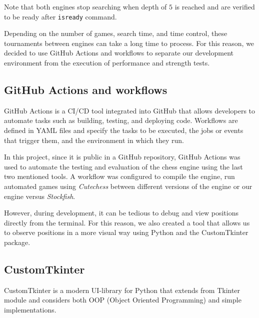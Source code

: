 \vspace{1em}

\noindent Note that both engines stop searching when depth of $5$ is reached and are verified to be ready after \texttt{isready} command.

\vspace{1em}

\noindent Depending on the number of games, search time, and time control, these tournaments between engines can take a long time to process. For this reason, we decided to use GitHub Actions and workflows to separate our development environment from the execution of performance and strength tests.

\subsection{GitHub Actions and workflows}

GitHub Actions is a CI/CD tool integrated into GitHub that allows developers to automate tasks such as building, testing, and deploying code. Workflows are defined in YAML files and specify the tasks to be executed, the jobs or events that trigger them, and the environment in which they run.

\vspace{1em}

\noindent In this project, since it is public in a GitHub repository, GitHub Actions was used to automate the testing and evaluation of the chess engine using the last two mentioned tools. A workflow was configured to compile the engine, run automated games using \textit{Cutechess} between different versions of the engine or our engine versus \textit{Stockfish}.

\vspace{1em}

\noindent However, during development, it can be tedious to debug and view positions directly from the terminal. For this reason, we also created a tool that allows us to observe positions in a more visual way using Python and the CustomTkinter package.

\subsection{CustomTkinter}

CustomTkinter is a modern UI-library for Python that extends from Tkinter module and considers both OOP (Object Oriented Programming) and simple implementations.

